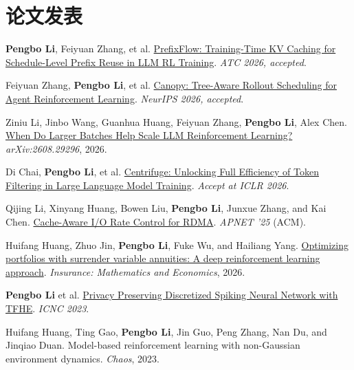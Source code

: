 \documentclass{resume}
\begin{document}
\section{论文发表}
\vspace{0.08cm}
\begin{enumerate}[label={[\arabic*]}, parsep=0.2ex, leftmargin=*]
    \item \textbf{Pengbo Li}, Feiyuan Zhang, et al. \href{https://arxiv.org/html/2606.01143v4}{PrefixFlow: Training-Time KV Caching for Schedule-Level Prefix Reuse in LLM RL Training}. \textit{ATC 2026, accepted}.
    \item Feiyuan Zhang, \textbf{Pengbo Li}, et al. \href{https://openreview.net/forum?id=FPJ4b4JwEE}{Canopy: Tree-Aware Rollout Scheduling for Agent Reinforcement Learning}. \textit{NeurIPS 2026, accepted}.
    \item Ziniu Li, Jinbo Wang, Guanhua Huang, Feiyuan Zhang, \textbf{Pengbo Li}, Alex Chen. \href{https://arxiv.org/abs/2608.29296}{When Do Larger Batches Help Scale LLM Reinforcement Learning?} \textit{arXiv:2608.29296}, 2026.
    \item Di Chai, \textbf{Pengbo Li}, et al. \href{https://openreview.net/forum?id=eshXwEnENV}{Centrifuge: Unlocking Full Efficiency of Token Filtering in Large Language Model Training}. \textit{Accept at ICLR 2026}.
    \item Qijing Li, Xinyang Huang, Bowen Liu, \textbf{Pengbo Li}, Junxue Zhang, and Kai Chen. \href{https://dl.acm.org/doi/10.1145/3735358.3735376}{Cache-Aware I/O Rate Control for RDMA}. \textit{APNET '25} (ACM).
    \item Huifang Huang, Zhuo Jin, \textbf{Pengbo Li}, Fuke Wu, and Hailiang Yang. \href{https://www.sciencedirect.com/science/article/pii/S0167668725001246}{Optimizing portfolios with surrender variable annuities: A deep reinforcement learning approach}. \textit{Insurance: Mathematics and Economics}, 2026.
    \item \textbf{Pengbo Li} et al. \href{https://doi.org/10.1109/ICNC59488.2023.10462898}{Privacy Preserving Discretized Spiking Neural Network with TFHE}. \textit{ICNC 2023}.
    \item Huifang Huang, Ting Gao, \textbf{Pengbo Li}, Jin Guo, Peng Zhang, Nan Du, and Jinqiao Duan. Model-based reinforcement learning with non-Gaussian environment dynamics. \textit{Chaos}, 2023.
\end{enumerate}
\end{document}
